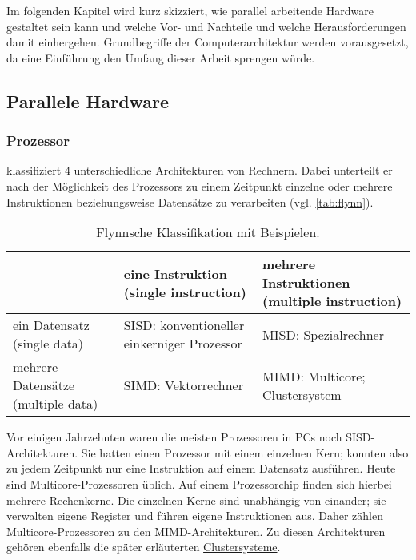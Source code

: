     Im folgenden Kapitel wird kurz skizziert, wie parallel arbeitende Hardware gestaltet sein kann und welche Vor- und Nachteile und welche Herausforderungen damit einhergehen. Grundbegriffe
    der Computerarchitektur werden vorausgesetzt, da eine Einführung den Umfang dieser Arbeit sprengen würde.
    
    \subsection{Parallele Hardware}
    \label{sec:parhard}
      \subsubsection{Prozessor}
      \label{sec:processor}
      \citet{flynn} klassifiziert 4 unterschiedliche Architekturen von Rechnern. Dabei unterteilt er nach der Möglichkeit des Prozessors zu einem Zeitpunkt einzelne oder mehrere
      Instruktionen beziehungsweise Datensätze zu verarbeiten (vgl. \autoref{tab:flynn}).
      \begin{table}[tb]
	\centering
	\begin{tabular}{|p{3.5cm}|p{4cm}|p{4cm}|}
	  \hline
			                             & eine Instruktion \newline (single instruction)       & mehrere Instruktionen \newline (multiple instruction) \\
	  \hline
	  ein Datensatz \newline (single data)       & SISD: konventioneller \newline einkerniger Prozessor & MISD: Spezialrechner                                  \\
	  \hline
	  mehrere Datensätze \newline (multiple data)& SIMD: Vektorrechner                                  & MIMD: Multicore; \newline Clustersystem               \\
	  \hline
	\end{tabular}
	\caption{Flynnsche Klassifikation mit Beispielen.}
	\label{tab:flynn}
      \end{table}
      
      Vor einigen Jahrzehnten waren die meisten Prozessoren in PCs noch SISD-Architekturen. Sie hatten einen Prozessor mit einem einzelnen Kern; konnten also zu jedem Zeitpunkt nur eine Instruktion
      auf einem Datensatz ausführen. Heute sind Multicore-Prozessoren üblich. Auf einem Prozessorchip finden sich hierbei mehrere Rechenkerne. Die einzelnen Kerne sind unabhängig von einander; sie 
      verwalten eigene Register und führen eigene Instruktionen aus. Daher zählen Multicore-Prozessoren zu den MIMD-Architekturen. Zu diesen Architekturen gehören ebenfalls die später erläuterten 
      \hyperref[sec:netzwerk]{Clustersysteme}. \citep{flynn, multicore}
      
